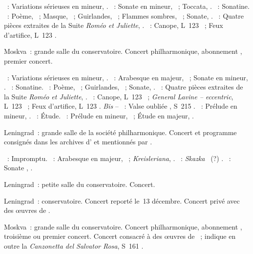 \begin{description}
 \textsc{\Mendelssohn{}}~: Variations sérieuses en \kD mineur, .
 \textsc{\Schumann{}}~: Sonate en \kF mineur, ~; Toccata, .
 \textsc{\Ravel{}}~: Sonatine.
 \textsc{\Scriabine{}}~: Poème,  ~; Masque, 
 ~; Guirlandes,  ~; Flammes sombres, 
 ~; Sonate, .
 \textsc{\Prokofiev{}}~: Quatre pièces extraites de la Suite \emph{Roméo et
 Juliette}, .
 \textsc{\Debussy{}}~: Canope, L~123 ~; Feux d'artifice, L~123
 .
 \item[\DateWithWeekDay{1940-11-02}]
 Moskva~: grande salle du conservatoire.
 Concert philharmonique, abonnement , premier concert.

 \textsc{\Mendelssohn{}}~: Variations sérieuses en \kD mineur, .
 \textsc{\Schumann{}}~: Arabesque en \kC majeur, ~; Sonate en \kF
 mineur, .
 \textsc{\Ravel{}}~: Sonatine.
 \textsc{\Scriabine{}}~: Poème,  ~; Guirlandes, 
 ~; Sonate, .
 \textsc{\Prokofiev{}}~: Quatre pièces extraites de la Suite \emph{Roméo et
 Juliette}, .
 \textsc{\Debussy{}}~: Canope, L~123 ~; \emph{General Lavine --
 eccentric}, L~123 ~; Feux d'artifice, L~123 .
 \emph{Bis} -- \textsc{\Liszt{}}~: Valse oubliée , S~215
 .
 \textsc{\Rachmaninov{}}~: Prélude en \kC \Sharp mineur, 
 .
 \textsc{\Chopin{}}~: Étude.
 \textsc{\Scriabine{}}~: Prélude en \kC \Sharp mineur, 
 ~; Étude en \kD \Flat majeur,  .
 \item[\DateWithWeekDay{1940-11-24}]
 Leningrad~: grande salle de la société philharmonique.
 Concert et programme consignés dans les archives d'\AVizel{} et mentionnés
 par \citet[p.~162]{Nekrasova08}.

 \textsc{\Schubert{}}~: Impromptu.
 \textsc{\Schumann{}}~: Arabesque en \kC majeur, ~;
 \emph{Kreisleriana}, .
 \textsc{\Medtner{}}~: \emph{Skazka} ~(?) .
 \textsc{\Scriabine{}}~: Sonate , .
 \item[\DateWithWeekDay{1940-11-25}]
 Leningrad~: petite salle du conservatoire.
 Concert.
 \item[\DateWithWeekDay{1940-11-29}]
 Leningrad~: conservatoire.
 Concert reporté le~13 décembre.
 Concert privé avec des œuvres de \Prokofiev{}.
 \item[\DateWithWeekDay{1940-12-02}]
 Moskva~: grande salle du conservatoire.
 Concert philharmonique, abonnement , troisième
 \citep[p.~417]{Scriabine} ou premier \citep[p.~162]{Nekrasova08} concert.
 Concert consacré à des œuvres de \Liszt{}~; \citeauthor{Nekrasova08}
 indique en outre la \emph{Canzonetta del Salvator Rosa}, S~161 .


\end{description}
